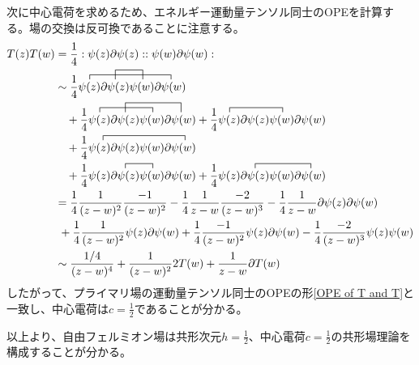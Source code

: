 \documentclass[11pt, dvipdfmx]{article}
\numberwithin{equation}{section}
\newcommand{\blankline}{\par\vspace{\baselineskip}} %
\begin{document}
次に中心電荷を求めるため、エネルギー運動量テンソル同士のOPEを計算する。場の交換は反可換であることに注意する。
\begin{align}
    T(z)T(w)&=\frac{1}{4}:\psi(z)\partial \psi(z)::\psi(w)\partial \psi(w):\notag\\
    &\sim \frac{1}{4}\contraction{}{\psi(z)}{\partial \psi(z)\psi(w)}{\partial\psi(w)}\contraction[2ex]{\psi(z)}{\partial \psi(z)}{}{\psi(w)} \psi(z)\partial \psi(z)\psi(w)\partial \psi(w) \nonumber\\
    &\ \ \ + \frac{1}{4}\contraction{}{\psi(z)}{\partial \psi(z)}{\psi(w)}\contraction[2ex]{\psi(z)}{\partial \psi(z)}{\psi(w)}{\partial \psi(w)}\psi(z)\partial \psi(z)\psi(w)\partial \psi(w)\nonumber
    +\frac{1}{4}\contraction{}{\psi(z)}{\partial \psi(z)}{\psi(w)}\psi(z)\partial \psi(z)\psi(w)\partial \psi(w)\notag\\  &\ \ \ + \frac{1}{4}\contraction{}{\partial \psi(z)}{\partial \psi(z)\psi(z)}{\partial\psi(w)}\psi(z)\partial \psi(z)\psi(w)\partial \psi(w)\notag\\
    &\ \ \ +\frac{1}{4}\contraction{\psi(z)}{\partial\psi(z)}{}{\psi(w)}\psi(z)\partial\psi(z)\psi(w)\partial\psi(w)+\frac{1}{4}\contraction{\psi(z)}{\partial\psi(z)}{\psi(w)}{\partial\psi(w)}\psi(z)\partial\psi(z)\psi(w)\partial\psi(w)\notag\\
    &= \frac{1}{4}\frac{1}{(z-w)^2}\frac{-1}{(z-w)^2} - \frac{1}{4}\frac{1}{z-w}\frac{-2}{(z-w)^3} - \frac{1}{4}\frac{1}{z-w}\partial \psi(z)\partial \psi(w) \nonumber\\
    &\ + \frac{1}{4}\frac{1}{(z-w)^2}\psi(z)\partial \psi(w)
    +\frac{1}{4}\frac{-1}{(z-w)^2}\psi(z)\partial\psi(w)-\frac{1}{4}\frac{-2}{(z-w)^3}\psi(z)\psi(w)\notag\\
    &\sim \frac{1/4}{(z-w)^4}+\frac{1}{(z-w)^2}2T(w) + \frac{1}{z-w}\partial T(w)
\end{align}
したがって、プライマリ場の運動量テンソル同士のOPEの形\eqref{OPE of T and T}と一致し、中心電荷は$c=\frac{1}{2}$であることが分かる。
\blankline

以上より、自由フェルミオン場は共形次元$h=\frac{1}{2}$、中心電荷$c=\frac{1}{2}$の共形場理論を構成することが分かる。
\end{document}
